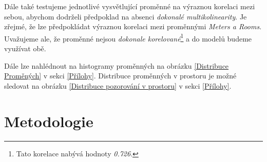 \documentclass[11pt, a4paper]{article}
\begin{document}
  \begin{table}[!htbp] \centering 
\caption{Popisné statistiky proměnných} 
\label{Popisné statistiky proměnných} 
\end{table} 

Dále také testujeme jednotlivé vysvětlující proměnné na výraznou korelaci mezi sebou, abychom dodrželi předpoklad na absenci \textit{dokonalé multikolinearity}. Je zřejmé, že lze předpokládat výraznou korelaci mezi proměnnými \textit{Meters a Rooms}. Uvažujeme ale, že proměnné nejsou \textit{dokonale korelované}\footnote{Tato korelace nabývá hodnoty \textit{0.726}.} a do modelů budeme využívat obě.  

Dále lze nahlédnout na histogramy proměnných na obrázku \ref{Distribuce Proměných} v sekci \ref{Přílohy}. Distribuce proměnných v prostoru je možné sledovat na obrázku \ref{Distribuce pozorování v prostoru} v sekci \ref{Přílohy}.

\section{Metodologie}
\end{document}
